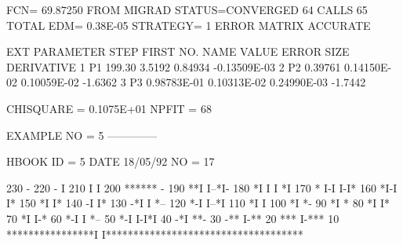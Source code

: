 \begin{Listing}
{ FCN=   69.87250     FROM MIGRAD    STATUS=CONVERGED     64 CALLS       65 TOTAL
                     EDM=  0.38E-05    STRATEGY= 1      ERROR MATRIX ACCURATE 

  EXT PARAMETER                                   STEP         FIRST   
  NO.   NAME        VALUE          ERROR          SIZE      DERIVATIVE 
   1      P1        199.30        3.5192       0.84934      -0.13509E-03
   2      P2       0.39761       0.14150E-02   0.10059E-02   -1.6362    
   3      P3       0.98783E-01   0.10313E-02   0.24990E-03   -1.7442    

 CHISQUARE = 0.1075E+01  NPFIT =   68
}



 EXAMPLE NO = 5                                                                  
 --------------                                                                  
 
                                                                                 
 
 HBOOK     ID =         5                                        DATE  18/05/92              NO =    17
 
      230                                               -
      220                                            -  I
      210                                            I  I
      200                                            ****** -
      190                                          **I  I--*I-
      180                                         *I I    I *I
      170                                        * I-I    I-I*
      160                                       *I-I         I*
      150                                      *I             I*
      140                                      -I              I*
      130                                    -*I               I *--
      120                                    *-I               I--*I
      110                                   *I                     I
      100                                  *I                      *-
       90                                 *I                        *
       80                                *I                         I*
       70                               *I                          I-*
       60                              *-I                           I *--
       50                             *-I                            I-I*I
       40                           -*I                                  **-
       30                         -**                                    I-**
       20                       ***                                        I-***
       10       ****************I                                              I************************************
 

\end{Listing}
